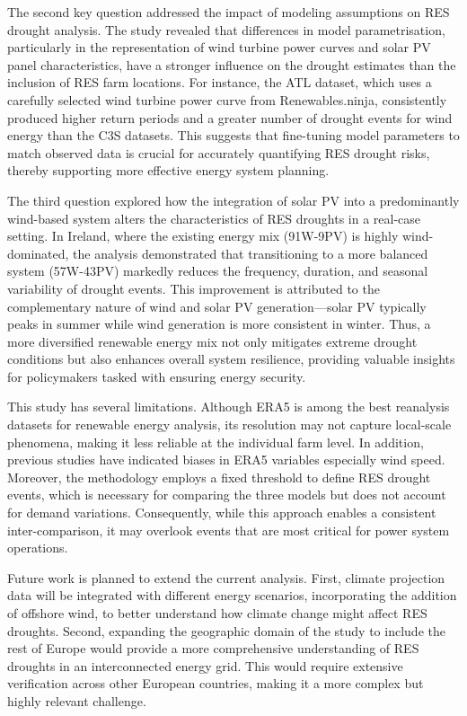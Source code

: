 \documentclass[preprint, 12pt]{elsarticle}
\begin{document}
The second key question addressed the impact of modeling assumptions on RES drought analysis. The study revealed that differences in model parametrisation, particularly in the representation of wind turbine power curves and solar PV panel characteristics, have a stronger influence on the drought estimates than the inclusion of RES farm locations. For instance, the ATL dataset, which uses a carefully selected wind turbine power curve from Renewables.ninja, consistently produced higher return periods and a greater number of drought events for wind energy than the C3S datasets. This suggests that fine-tuning model parameters to match observed data is crucial for accurately quantifying RES drought risks, thereby supporting more effective energy system planning.

The third question explored how the integration of solar PV into a predominantly wind-based system alters the characteristics of RES droughts in a real-case setting. In Ireland, where the existing energy mix (91W-9PV) is highly wind-dominated, the analysis demonstrated that transitioning to a more balanced system (57W-43PV) markedly reduces the frequency, duration, and seasonal variability of drought events. This improvement is attributed to the complementary nature of wind and solar PV generation—solar PV typically peaks in summer while wind generation is more consistent in winter. Thus, a more diversified renewable energy mix not only mitigates extreme drought conditions but also enhances overall system resilience, providing valuable insights for policymakers tasked with ensuring energy security.

This study has several limitations. Although ERA5 is among the best reanalysis datasets for renewable energy analysis, its resolution may not capture local-scale phenomena, making it less reliable at the individual farm level. In addition, previous studies have indicated biases in ERA5 variables especially wind speed. Moreover, the methodology employs a fixed threshold to define RES drought events, which is necessary for comparing the three models but does not account for demand variations. Consequently, while this approach enables a consistent inter-comparison, it may overlook events that are most critical for power system operations.

Future work is planned to extend the current analysis. First, climate projection data will be integrated with different energy scenarios, incorporating the addition of offshore wind, to better understand how climate change might affect RES droughts. Second, expanding the geographic domain of the study to include the rest of Europe would provide a more comprehensive understanding of RES droughts in an interconnected energy grid. This would require extensive verification across other European countries, making it a more complex but highly relevant challenge.
\end{document}
